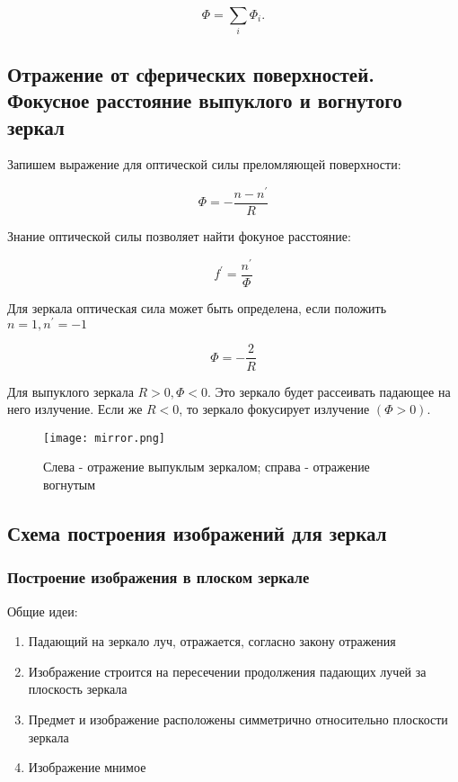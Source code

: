 \begin{equation*}
    \Phi = \sum_i \Phi_i.
\end{equation*}

\subsection{Отражение от сферических поверхностей. Фокусное расстояние выпуклого и вогнутого зеркал}



Запишем выражение для оптической силы преломляющей поверхности:

\begin{equation*}
    \Phi = -\frac{n-n^{'}}{R}
\end{equation*}

Знание оптической силы позволяет найти фокуное расстояние:

\begin{equation*}
    f^{'} = \frac{n^{'}}{\Phi}
\end{equation*}

Для зеркала оптическая сила может быть определена, если положить $n = 1, n^{'} = -1$

\begin{equation*}
    \Phi = -\frac{2}{R}
\end{equation*}

Для выпуклого зеркала $R > 0, \Phi < 0$. Это зеркало будет рассеивать падающее на него излучение. Если же $R < 0$, то зеркало фокусирует излучение $(\Phi > 0)$.

\begin{figure}[h!]
    \centering
    \texttt{[image: mirror.png]}
    \caption{Слева - отражение выпуклым зеркалом; справа - отражение вогнутым }
    \label{fig:my_label}
\end{figure} 

\subsection{Схема построения изображений для зеркал}


\subsubsection{Построение изображения в плоском зеркале}

Общие идеи:

\begin{enumerate}
    \item Падающий на зеркало луч, отражается, согласно закону отражения
    \item Изображение строится на пересечении продолжения падающих лучей за плоскость зеркала
    \item Предмет и изображение расположены симметрично относительно плоскости зеркала
    \item Изображение мнимое
\end{enumerate}

